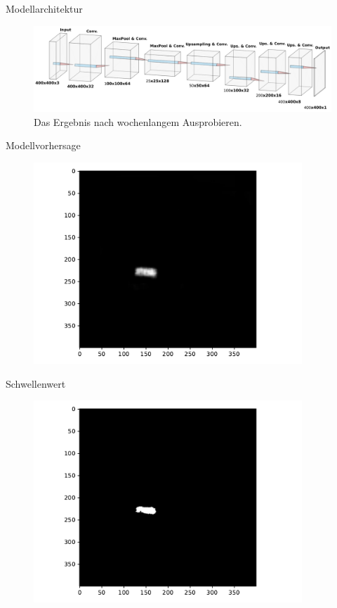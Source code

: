 \begin{frame}{Modellarchitektur}
    \begin{figure}
        \centering
        \includegraphics[width=\textwidth]{img/nn.pdf}
        \caption{Das Ergebnis nach wochenlangem Ausprobieren.}
    \end{figure}
\end{frame}

\begin{frame}{Modellvorhersage}
    \begin{figure}
        \centering
        \includegraphics[width=0.9\textwidth]{img/model_demo_3}
    \end{figure}
\end{frame}

\begin{frame}{Schwellenwert}
    \begin{figure}
        \centering
        \includegraphics[width=0.9\textwidth]{img/model_demo_4}
    \end{figure}
\end{frame}

